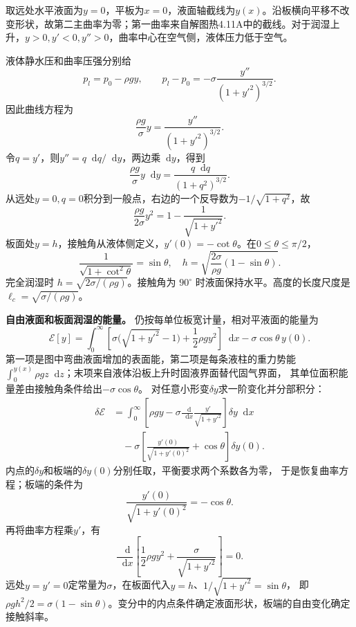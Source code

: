 \documentclass[UTF8,fontset=fandol,a4paper,11pt]{ctexart}
\newcommand{\dd}{\mathop{}\!\mathrm{d}}
\newcommand{\result}[1]{\boxed{#1}}
\newcommand{\figcaption}[1]{\par\vspace{2pt}{\small\color{muted}#1}\par}
\begin{document}
取远处水平液面为$y=0$，平板为$x=0$，液面轴截线为$y(x)$。沿板横向平移不改变形状，故第二主曲率为零；第一曲率来自解图热4.11A中的截线。对于润湿上升，$y>0,y'<0,y''>0$，曲率中心在空气侧，液体压力低于空气。
\begin{center}\begin{minipage}{0.96\linewidth}\centering{}\figcaption{解图 热4.11A　曲率中心在空气侧，液体侧压强低于外界。}\end{minipage}\end{center}
液体静水压和曲率压强分别给
\[
p_l=p_0-\rho gy,
\qquad p_l-p_0=-\sigma\frac{y''}{(1+y'^2)^{3/2}}.
\]
因此曲线方程为
\[
\frac{\rho g}{\sigma}y=\frac{y''}{(1+y'^2)^{3/2}}.
\]
令$q=y'$，则$y''=q\dd q/\dd y$，两边乘$\dd y$，得到
\[
\frac{\rho g}{\sigma}y\dd y=\frac{q\dd q}{(1+q^2)^{3/2}}.
\]
从远处$y=0,q=0$积分到一般点，右边的一个反导数为$-1/\sqrt{1+q^2}$，故
\[
\frac{\rho g}{2\sigma}y^2=1-\frac1{\sqrt{1+y'^2}}.
\]
板面处$y=h$，接触角从液体侧定义，$y'(0)=-\cot\theta$。在$0\le\theta\le\pi/2$，
\[
\frac1{\sqrt{1+\cot^2\theta}}=\sin\theta,
\quad \result{h=\sqrt{\frac{2\sigma}{\rho g}(1-\sin\theta)}}.
\]
完全润湿时 $h=\sqrt{2\sigma/(\rho g)}$。接触角为 $90^\circ$ 时液面保持水平。高度的长度尺度是 $\ell_c=\sqrt{\sigma/(\rho g)}$。

\textbf{自由液面和板面润湿的能量。} 仍按每单位板宽计量，相对平液面的能量为
\[
\mathcal E[y]=\int_0^\infty
\left[\sigma\bigl(\sqrt{1+y'^2}-1\bigr)+\frac12\rho gy^2\right]\dd x
-\sigma\cos\theta\,y(0).
\]
第一项是图中弯曲液面增加的表面能，第二项是每条液柱的重力势能
$\int_0^{y(x)}\rho gz\dd z$；末项来自液体沿板上升时固液界面替代固气界面，
其单位面积能量差由接触角条件给出$-\sigma\cos\theta$。
对任意小形变$\delta y$求一阶变化并分部积分：
\begin{align*}
\delta\mathcal E
&=\int_0^\infty\left[\rho gy-
\sigma\frac{\dd}{\dd x}\frac{y'}{\sqrt{1+y'^2}}\right]\delta y\dd x\\
&\quad-\sigma\left[\frac{y'(0)}{\sqrt{1+y'(0)^2}}+\cos\theta\right]\delta y(0).
\end{align*}
内点的$\delta y$和板端的$\delta y(0)$分别任取，平衡要求两个系数各为零，
于是恢复曲率方程；板端的条件为\[\frac{y'(0)}{\sqrt{1+y'(0)^2}}=-\cos\theta.\]
再将曲率方程乘$y'$，有
\[
\frac{\dd}{\dd x}\left[\frac12\rho gy^2+
\frac{\sigma}{\sqrt{1+y'^2}}\right]=0.
\]
远处$y=y'=0$定常量为$\sigma$，在板面代入$y=h$、$1/\sqrt{1+y'^2}=\sin\theta$，
即 $\rho gh^2/2=\sigma(1-\sin\theta)$。变分中的内点条件确定液面形状，板端的自由变化确定接触斜率。
\end{document}
